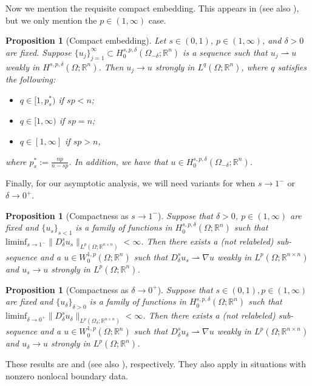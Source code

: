 \documentclass[11pt, reqno]{amsart}   	%
\theoremstyle{plain}
\numberwithin{equation}{section}
\newtheorem{proposition}[thm]{Proposition}
\def\de{\delta}
\def\Om{\Omega}
\def\R{\mathbb{R}}
\def\grad{\nabla}
\def\liminf{\text{liminf}}
\begin{document}
Now we mention the requisite compact embedding. This appears in \cite[Theorem 7.3]{bellido2023non} (see also \cite[Theorem 2.9]{bellido2023minimizers}), but we only mention the $p \in (1, \infty)$ case.
    	\begin{proposition}[Compact embedding]\label{Prop: CompactEmbedding}
		Let $s \in (0, 1)$, $p \in (1, \infty)$, and $\de > 0$ are fixed. Suppose $\{u_j\}^{\infty}_{j = 1} \subset H^{s, p, \de}_0(\Om_{-\de}; \R^n)$ is a sequence such that $u_j \rightharpoonup u$ weakly in $H^{s, p, \de}(\Om; \R^n)$. Then $u_j \rightarrow u$ strongly in $L^q(\Om; \R^n)$, where $q$ satisfies the following:
		\begin{itemize}
			\item $q \in [1, p^*_s)$ if $sp < n$;
			\item $q \in [1, \infty)$ if $sp = n$;
			\item $q \in [1, \infty]$ if $sp > n$,
		\end{itemize}
		where $p^*_s := \frac{np}{n - sp}$. In addition, we have that $u \in H^{s, p, \de}_0(\Om_{-\de}; \R^n)$.
	\end{proposition}

    Finally, for our asymptotic analysis, we will need variants for when $s \rightarrow 1^-$ or $\de \rightarrow 0^+$.

    \begin{proposition}[Compactness as $s \rightarrow 1^-$]\label{Prop: CompactVarys->1}
        Suppose that $\de > 0$, $p \in (1, \infty)$ are fixed and $\{u_s\}_{s < 1}$ is a family of functions in $H^{s, p, \de}_0(\Om; \R^n)$ such that $\liminf_{s \rightarrow 1^-}\|D^s_{\de}u_s\|_{L^p(\Om; \R^{n \times n})} < \infty$. Then there exists a (not relabeled) sub-sequence and a $u \in W^{1, p}_0(\Om; \R^n)$ such that $D^s_{\de}u_s \rightharpoonup \grad u$ weakly in $L^p(\Om; \R^{n \times n})$ and $u_s \rightarrow u$ strongly in $L^p(\Om; \R^n)$. 
    \end{proposition}

    \begin{proposition}[Compactness as $\de \rightarrow 0^+$]\label{Prop: CompactVaryde-0}
         Suppose that $s \in (0, 1), p \in (1, \infty)$ are fixed and $\{u_{\de}\}_{\de > 0}$ is a family of functions in $H^{s, p, \de}_0(\Om; \R^n)$ such that $\liminf_{\de \rightarrow 0^+}\|D^s_{\de} u_{\de}\|_{L^p(\Om_{\de}; \R^{n \times n})} < \infty$. Then there exists a (not relabeled) sub-sequence and a $u \in W^{1, p}_0(\Om; \R^n)$ such that $D^s_{\de}u_{\de} \rightharpoonup \grad u$ weakly in $L^p(\Om; \R^{n \times n})$ and $u_{\de} \rightarrow u$ strongly in $L^p(\Om; \R^n)$. 
    \end{proposition}
    These results are \cite[Lemma 9]{cueto2023variational} and \cite[Lemma 3.6]{cueto2025gamma} (see also \cite[Lemma 6.3.6]{schonberger2024nonlocal}), respectively. They also apply in situations with nonzero nonlocal boundary data.
\end{document}

